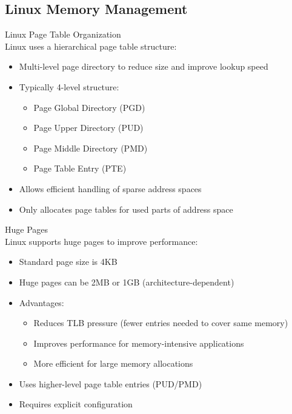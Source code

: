 \multend

\subsection{Linux Memory Management}

\begin{definition}{Linux Page Table Organization}\\
    Linux uses a hierarchical page table structure:
    \begin{itemize}
        \item Multi-level page directory to reduce size and improve lookup speed
        \item Typically 4-level structure:
            \begin{itemize}
                \item Page Global Directory (PGD)
                \item Page Upper Directory (PUD)
                \item Page Middle Directory (PMD)
                \item Page Table Entry (PTE)
            \end{itemize}
        \item Allows efficient handling of sparse address spaces
        \item Only allocates page tables for used parts of address space
    \end{itemize}
\end{definition}

\begin{definition}{Huge Pages}\\
    Linux supports huge pages to improve performance:
    \begin{itemize}
        \item Standard page size is 4KB
        \item Huge pages can be 2MB or 1GB (architecture-dependent)
        \item Advantages:
            \begin{itemize}
                \item Reduces TLB pressure (fewer entries needed to cover same memory)
                \item Improves performance for memory-intensive applications
                \item More efficient for large memory allocations
            \end{itemize}
        \item Uses higher-level page table entries (PUD/PMD)
        \item Requires explicit configuration
    \end{itemize}
\end{definition}

